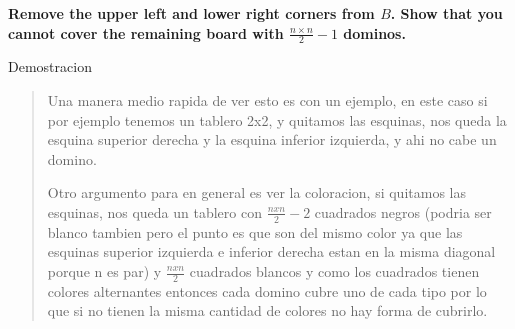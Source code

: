 \textbf{Remove the upper left and lower right corners from $B$. Show that you cannot cover the remaining board with $\frac{n \times n}{2}-1$ dominos.}\vspace{.2cm}

\textcolor{bibi}{Demostracion}
\begin{quote}
    Una manera medio rapida de ver esto es con un ejemplo, en este caso si por ejemplo tenemos un tablero 2x2, y quitamos las esquinas, nos queda la esquina superior derecha y la esquina inferior izquierda, y ahi no cabe un domino. \vspace{.2cm}

    Otro argumento para en general es ver la coloracion, si quitamos las esquinas, nos queda un tablero con $\frac{nxn}{2}-2$ cuadrados negros (podria ser blanco tambien pero el punto es que son del mismo color ya que las esquinas superior izquierda e inferior derecha estan en la misma diagonal porque n es par) y  $\frac{nxn}{2}$ cuadrados blancos y como los cuadrados tienen colores alternantes entonces cada domino cubre uno de cada tipo por lo que si no tienen la misma cantidad de colores no hay forma de cubrirlo. \vspace{.2cm}
\end{quote} 